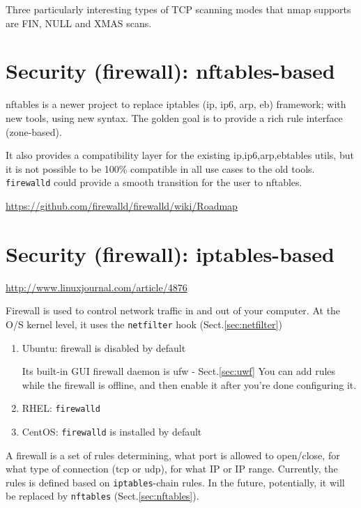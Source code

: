 Three particularly interesting types of TCP scanning modes that nmap supports
are FIN, NULL and XMAS scans.



\section{Security (firewall): nftables-based}
\label{sec:firewall-nftables-based}
\label{sec:nftables}

nftables is a newer project to replace iptables  (ip, ip6, arp, eb) framework;
with new tools, using new syntax. The golden goal is to provide a rich rule
interface (zone-based).

It also provides a compatibility layer for the existing {ip,ip6,arp,eb}tables
utils, but it is not possible to be 100\% compatible in all use cases to the old
tools. \verb!firewalld! could provide a smooth transition for the user to
nftables.

\url{https://github.com/firewalld/firewalld/wiki/Roadmap}



\section{Security (firewall): iptables-based}
\label{sec:firewall}


\url{http://www.linuxjournal.com/article/4876}

Firewall is used to control network traffic in and out of your computer.
At the O/S kernel level, it uses the \verb!netfilter! hook
(Sect.\ref{sec:netfilter})
\begin{enumerate}
  \item Ubuntu: firewall is disabled by default

Its built-in GUI firewall daemon is ufw - Sect.\ref{sec:uwf}  
You can add rules while the firewall is offline, and then enable it after you're
done configuring it.
  
  \item RHEL: \verb!firewalld! 
  
  \item CentOS: \verb!firewalld! is installed by default
\end{enumerate}


A firewall is a set of rules determining, what port is allowed to open/close,
for what type of connection (tcp or udp), for what IP or IP range.
Currently, the rules is defined based on \verb!iptables!-chain rules. 
In the future, potentially, it will be replaced by \verb!nftables!
(Sect.\ref{sec:nftables}).

